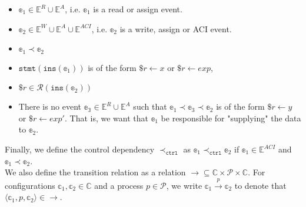 \documentclass{article}
\begin{document}
\begin{itemize}
    \setlength\itemsep{0em}
    \item $\mathbb{e}_1 \in \mathbb{E}^R \cup \mathbb{E}^A$, i.e. $\mathbb{e}_1$ is a read or assign event.
    \item $\mathbb{e}_2 \in \mathbb{E}^W \cup \mathbb{E}^A \cup \mathbb{E}^{ACI}$, i.e. $\mathbb{e}_2$ is a write, assign or ACI event.
    \item $\mathbb{e}_1 \prec \mathbb{e}_2$
    \item $\texttt{stmt}(\texttt{ins}(\mathbb{e}_1))$ is of the form $\$r \leftarrow x$ or $\$r \leftarrow exp$,
    \item $\$r \in \mathcal{R}(\texttt{ins}(\mathbb{e}_2))$
    \item There is no event $\mathbb{e_3} \in \mathbb{E}^R \cup \mathbb{E}^A$ such that $\mathbb{e}_1 \prec \mathbb{e}_3 \prec \mathbb{e}_2$ is of the form $\$r \leftarrow y$ or $\$r \leftarrow exp'$. That is, we want that $\mathbb{e}_1$ be responsible for "supplying" the data to $\mathbb{e}_2$.
\end{itemize}
Finally, we define the control dependency $\prec_\texttt{ctrl}$ as $\mathbb{e}_1 \prec_\texttt{ctrl} \mathbb{e}_2$ if $\mathbb{e}_1 \in \mathbb{E}^{ACI}$ and $\mathbb{e}_1 \prec \mathbb{e}_2$.\\
We also define the transition relation as a relation $\longrightarrow \subseteq \mathbb{C} \times \mathcal{P} \times \mathbb{C}$. For configurations $\mathbb{c}_1,\mathbb{c}_2 \in \mathbb{C}$ and a process $p \in \mathcal{P}$, we write $\mathbb{c}_1 \xrightarrow{p} \mathbb{c}_2$ to denote that $\langle\mathbb{c}_1,p,\mathbb{c}_2\rangle \in \longrightarrow$.
\vspace{-2em}
\end{document}
